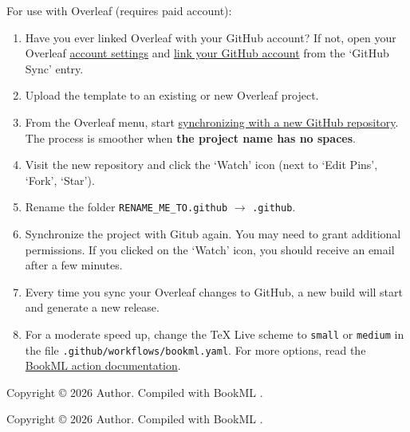 \documentclass[british,oneside,11pt]{amsart}
\begin{document}
For use with Overleaf (requires paid account):
\begin{enumerate}
  \item Have you ever linked Overleaf with your GitHub account? If not, open your Overleaf \href{https://www.overleaf.com/user/settings}{account settings} and \href{https://docs.overleaf.com/integrations-and-add-ons/git-integration-and-github-synchronization/github-synchronization#linking-your-overleaf-account-to-your-github-account}{link your GitHub account} from the `GitHub Sync' entry.
  \item Upload the template to an existing or new Overleaf project.
  \item From the Overleaf menu, start \href{https://docs.overleaf.com/integrations-and-add-ons/git-integration-and-github-synchronization/github-synchronization#creating-a-new-github-repository-from-an-overleaf-project}{synchronizing with a new GitHub repository}. The process is smoother when \textbf{the project name has no spaces}.
  \item Visit the new repository and click the `Watch' icon (next to `Edit Pins', `Fork', `Star').
  \item Rename the folder \texttt{RENAME\_ME\_TO.github} $\to$ \texttt{.github}.
  \item Synchronize the project with Gitub again. You may need to grant additional permissions. If you clicked on the `Watch' icon, you should receive an email after a few minutes.
  \item Every time you sync your Overleaf changes to GitHub, a new build will start and generate a new release.
  \item For a moderate speed up, change the \TeX{} Live scheme to \texttt{small} or \texttt{medium} in the file \texttt{.github/workflows/bookml.yaml}. For more options, read the \href{https://github.com/marketplace/actions/compile-with-bookml}{BookML action documentation}.
\end{enumerate}

\begin{lxFooter}
  Copyright \copyright{} 2026 Author. Compiled with BookML \BookMLversion.
\end{lxFooter}

\iflatexml\else
\bigskip
\begin{center}
  {\small Copyright \copyright{} 2026 Author. Compiled with BookML \BookMLversion.}
\end{center}
\fi
\end{document}
